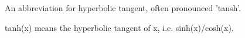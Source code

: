 An abbreviation for hyperbolic tangent, often pronounced 'tansh'.
\par
tanh(x) means the hyperbolic tangent of x, i.e. sinh(x)/cosh(x).